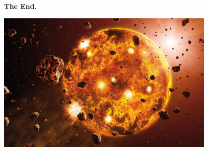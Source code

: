 \documentclass{beamer}
\newcommand{\pagestepalt}[2]{
  \begin{frame}[t]
    \begin{minipage}[t][0.26\textheight][t]{\textwidth}
      \begin{center}
        \huge
        \textbf{#1}
      \end{center}
    \end{minipage}
    
    \begin{minipage}[t][0.7\textheight][t]{\textwidth}
      #2
    \end{minipage}
  \end{frame}
}
\begin{document}
\pagestepalt{The End.}{
  \begin{center}
    \includegraphics[width=0.8\textwidth]{images/formation.jpg}
  \end{center}
}
\end{document}

